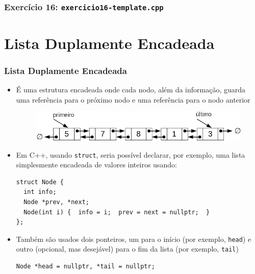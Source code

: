 \documentclass[aspectratio=169]{beamer}
\begin{document}
\begin{frame}[fragile]\frametitle{Exercício 16: \texttt{exercicio16-template.cpp}}
\fontsize{5pt}{5pt}\selectfont{

}
\end{frame}

\section{Lista Duplamente Encadeada}

\begin{frame}[fragile]\frametitle{Lista Duplamente Encadeada}
\begin{itemize}
	\item É uma estrutura encadeada onde cada nodo, além da informação, guarda uma referência para o próximo nodo e uma referência para o nodo anterior
\begin{figure}[h]
	\centering
	\includegraphics[height=0.15\paperheight]{imagens/lista_duplamente_encadeada.png}
\end{figure}
	\item Em C++, usando \texttt{struct}, seria possível declarar, por exemplo, uma lista simplesmente encadeada de valores inteiros usando:
\begin{lstlisting}[basicstyle=\ttfamily\scriptsize]
struct Node {
  int info;
  Node *prev, *next;
  Node(int i) {  info = i;  prev = next = nullptr;  }
};
\end{lstlisting}
	\item Também são usados dois ponteiros, um para o início (por exemplo, \texttt{head}) e outro (opcional, mas desejável)	 para o fim da lista (por exemplo, \texttt{tail})
\begin{lstlisting}[basicstyle=\ttfamily\scriptsize]
Node *head = nullptr, *tail = nullptr;
\end{lstlisting}
\end{itemize}
\end{frame}
\end{document}
